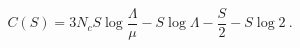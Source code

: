 \begin{equation}
C(S)=3N_cS\log{\frac{\Lambda}{\mu}}-S\log{\Lambda}-\frac{S}{2}-S\log{2} ~.
\end{equation}

